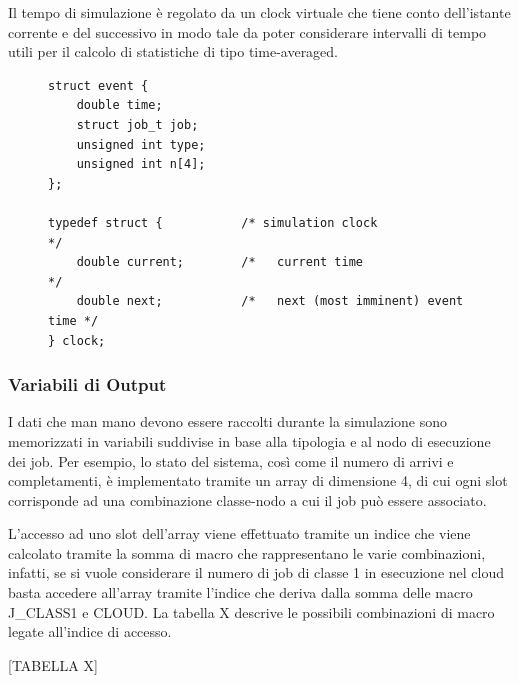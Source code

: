 Il tempo di simulazione è regolato da un clock virtuale che tiene conto
dell’istante corrente e del successivo in modo tale da poter considerare
intervalli di tempo utili per il calcolo di statistiche di tipo time-averaged.

\begin{figure}[!h]
\begin{lstlisting}[title=basic.h]
struct event {
    double time;
    struct job_t job;
    unsigned int type;
    unsigned int n[4];
};

typedef struct {           /* simulation clock                  */
    double current;        /*   current time                    */
    double next;           /*   next (most imminent) event time */
} clock;
\end{lstlisting}
\end{figure}

%
\subsubsection{Variabili di Output}
I dati che man mano devono essere raccolti durante la simulazione sono
memorizzati in variabili suddivise in base alla tipologia e al nodo di
esecuzione dei job. Per esempio, lo stato del sistema, così come il numero di
arrivi e completamenti, è implementato tramite un array di dimensione 4, di cui
ogni slot corrisponde ad una combinazione classe-nodo a cui il job può essere
associato. 

L’accesso ad uno slot dell’array viene effettuato tramite un indice
che viene calcolato tramite la somma di macro che rappresentano le varie
combinazioni, infatti, se si vuole considerare il numero di job di classe 1 in
esecuzione nel cloud basta accedere all’array tramite l’indice che deriva dalla
somma delle macro J\_CLASS1 e CLOUD. La tabella X descrive le possibili
combinazioni di macro legate all’indice di accesso.

[TABELLA X]

%

